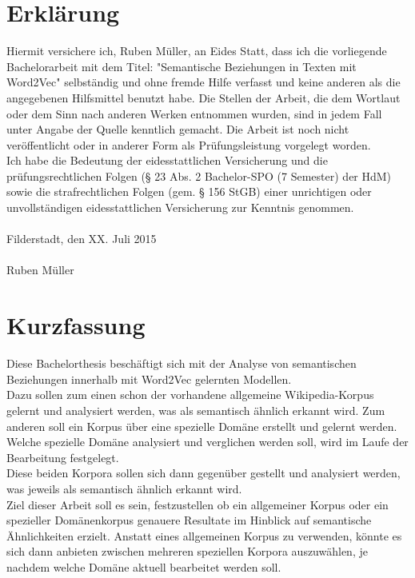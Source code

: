\documentclass[12pt,a4paper]{report}
\begin{document}
\chapter*{Erklärung}
Hiermit versichere ich, Ruben Müller, an Eides Statt, dass ich die vorliegende
Bachelorarbeit mit dem Titel: "Semantische Beziehungen in Texten mit Word2Vec" selbständig und ohne fremde Hilfe verfasst und keine anderen als die angegebenen
Hilfsmittel benutzt habe. Die Stellen der Arbeit, die dem Wortlaut oder dem Sinn nach anderen
Werken entnommen wurden, sind in jedem Fall unter Angabe der Quelle kenntlich gemacht. Die
Arbeit ist noch nicht veröffentlicht oder in anderer Form als Prüfungsleistung vorgelegt worden.\\
Ich habe die Bedeutung der eidesstattlichen Versicherung und die prüfungsrechtlichen Folgen (§ 23 Abs. 2 Bachelor-SPO (7 Semester) der HdM) sowie die strafrechtlichen Folgen (gem. § 156 StGB) einer unrichtigen oder
unvollständigen eidesstattlichen Versicherung zur Kenntnis genommen.\\
\vspace{1em}\\
Filderstadt, den XX. Juli 2015\\
\vspace{5em}\\
Ruben Müller


\newpage
\chapter*{Kurzfassung}
Diese Bachelorthesis beschäftigt sich mit der Analyse von semantischen Beziehungen innerhalb mit Word2Vec gelernten Modellen.
\\Dazu sollen zum einen schon der vorhandene allgemeine Wikipedia-Korpus gelernt und analysiert werden, was als semantisch ähnlich erkannt wird. Zum anderen soll ein Korpus über eine spezielle Domäne erstellt und gelernt werden. Welche spezielle Domäne analysiert und verglichen werden soll, wird im Laufe der Bearbeitung festgelegt.
\\Diese beiden Korpora sollen sich dann gegenüber gestellt und analysiert werden, was jeweils als semantisch ähnlich erkannt wird. 
\\Ziel dieser Arbeit soll es sein, festzustellen ob ein allgemeiner Korpus oder ein spezieller Domänenkorpus genauere Resultate im Hinblick auf semantische Ähnlichkeiten erzielt. Anstatt eines allgemeinen Korpus zu verwenden, könnte es sich dann anbieten zwischen mehreren speziellen Korpora auszuwählen, je nachdem welche Domäne aktuell bearbeitet werden soll.
\newpage
\end{document}
